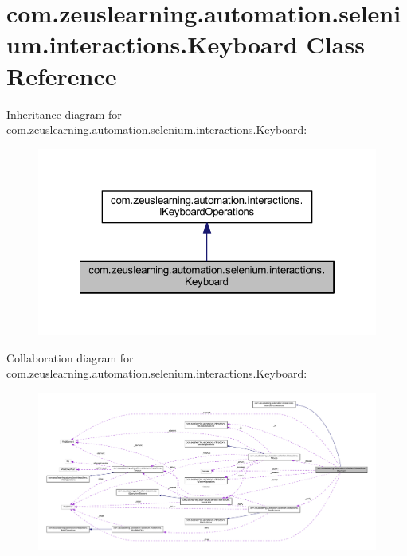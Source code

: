 \hypertarget{classcom_1_1zeuslearning_1_1automation_1_1selenium_1_1interactions_1_1Keyboard}{}\section{com.\+zeuslearning.\+automation.\+selenium.\+interactions.\+Keyboard Class Reference}
\label{classcom_1_1zeuslearning_1_1automation_1_1selenium_1_1interactions_1_1Keyboard}


Inheritance diagram for com.\+zeuslearning.\+automation.\+selenium.\+interactions.\+Keyboard\+:\nopagebreak
\begin{figure}[H]
\begin{center}
\leavevmode
\includegraphics[width=322pt]{de/da0/classcom_1_1zeuslearning_1_1automation_1_1selenium_1_1interactions_1_1Keyboard__inherit__graph}
\end{center}
\end{figure}


Collaboration diagram for com.\+zeuslearning.\+automation.\+selenium.\+interactions.\+Keyboard\+:
\nopagebreak
\begin{figure}[H]
\begin{center}
\leavevmode
\includegraphics[width=350pt]{d5/d5d/classcom_1_1zeuslearning_1_1automation_1_1selenium_1_1interactions_1_1Keyboard__coll__graph}
\end{center}
\end{figure}
